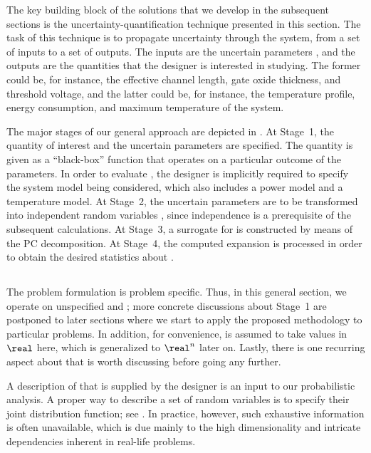 The key building block of the solutions that we develop in the subsequent
sections is the uncertainty-quantification technique presented in this section.
The task of this technique is to propagate uncertainty through the system, from
a set of inputs to a set of outputs. The inputs are the uncertain parameters
\vu, and the outputs are the quantities that the designer is interested in
studying. The former could be, for instance, the effective channel length, gate
oxide thickness, and threshold voltage, and the latter could be, for instance,
the temperature profile, energy consumption, and maximum temperature of the
system.

The major stages of our general approach are depicted in .
At Stage~1, the quantity of interest \g and the uncertain parameters \vu are
specified. The quantity is given as a ``black-box'' function that operates on a
particular outcome of the parameters. In order to evaluate \g, the designer is
implicitly required to specify the system model being considered, which also
includes a power model and a temperature model. At Stage~2, the uncertain
parameters \vu are to be transformed into independent random variables \vz,
since independence is a prerequisite of the subsequent calculations. At Stage~3,
a surrogate for \g is constructed by means of the \ac{PC} decomposition. At
Stage~4, the computed expansion is processed in order to obtain the desired
statistics about \g.

\subsection{\problemtitle}

The problem formulation is problem specific. Thus, in this general section, we
operate on unspecified \g and \vu; more concrete discussions about Stage~1 are
postponed to later sections where we start to apply the proposed methodology to
particular problems. In addition, for convenience, \g is assumed to take values
in $\real$ here, which is generalized to $\real^n$ later on. Lastly, there is
one recurring aspect about \vu that is worth discussing before going any
further.

A description of \vu that is supplied by the designer is an input to our
probabilistic analysis. A proper way to describe a set of random variables is to
specify their joint distribution function; see . In
practice, however, such exhaustive information is often unavailable, which is
due mainly to the high dimensionality and intricate dependencies inherent in
real-life problems.

